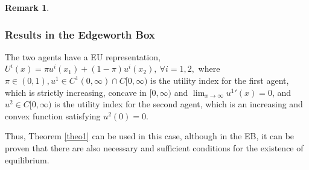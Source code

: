\documentclass[pdftex]{article}
\numberwithin{equation}{section}
\theoremstyle{th}
\newtheorem{proof lemma}{{Proof Lemma}.}
\theoremstyle{definition}
\newtheorem{remark}{Remark}%
\newtheorem*{risk lovers}{Risk lovers}
\newtheorem*{risk averse}{Risk averse}
\begin{document}
\begin{remark}
\end{remark}


\subsubsection{Results in the Edgeworth Box}

The two agents have a EU representation, $U^{i}\left(x\right)=\pi u^{i}\left(x_{1}\right)+\left(1-\pi\right)u^{i}\left(x_{2}\right),\ \forall i=1,2,$
where $\pi\!\in\!\left(0,1\right),u^{1}\in\!{C}^{1}\left(0,\infty\right)\cap{C}[0,\infty)$ is the utility index for the first agent, which is strictly increasing, concave in $[0,\infty)$ and $\lim_{x\rightarrow\infty}{u^1}'(x)=0$, and $u^{2}\in{C}[0,\infty)$ is the utility index for the second agent, which is an increasing and convex function satisfying $u^2(0)=0$.

Thus, Theorem \ref{theo1} can be used in this case, although in the EB, it can be proven that there are also necessary and sufficient conditions for the existence of equilibrium.
\end{document}
